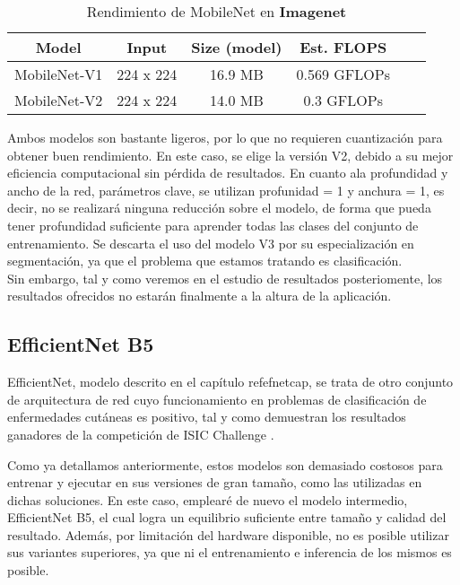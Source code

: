 \begin{table}[!ht]
	\centering
	\begin{tabular}{|c|c|c|c|c|c|}
		\hline
		\textbf{Model} & \textbf{Input} & \textbf{Size (model)} & \textbf{Est. FLOPS}  \\ \hline
		MobileNet-V1 & 224 x 224 & 16.9 MB & 0.569 GFLOPs \\ \hline
		MobileNet-V2 & 224 x 224 & 14.0 MB & 0.3 GFLOPs	  \\ \hline
	\end{tabular}
		\caption{Rendimiento de MobileNet en \textbf{Imagenet} \cite{mobilespecs}}
\end{table}

Ambos modelos son bastante ligeros, por lo que no requieren cuantización para obtener buen rendimiento. En este caso, se elige la versión V2, debido a su mejor eficiencia computacional sin pérdida de resultados. En cuanto ala profundidad y ancho de la red, parámetros clave, se utilizan profunidad = 1 y anchura = 1, es decir, no se realizará ninguna reducción sobre el modelo, de forma que pueda tener profundidad suficiente para aprender todas las clases del conjunto de entrenamiento. Se descarta el uso del modelo V3 por su especialización en segmentación, ya que el problema que estamos tratando es clasificación.\\

Sin embargo, tal y como veremos en el estudio de resultados posteriomente, los resultados ofrecidos no estarán finalmente a la altura de la aplicación.


\subsection{EfficientNet B5}

EfficientNet, modelo descrito en el capítulo ref{efnetcap},  se trata de otro conjunto de arquitectura de red cuyo funcionamiento en problemas de clasificación de enfermedades cutáneas es positivo, tal y como demuestran los resultados ganadores de la competición de ISIC Challenge \cite{1stISIC, 2ndISIC}.

Como ya detallamos anteriormente, estos modelos son demasiado costosos para entrenar y ejecutar en sus versiones de gran tamaño, como las utilizadas en dichas soluciones. En este caso, emplearé de nuevo el modelo intermedio, EfficientNet B5, el cual logra un equilibrio suficiente entre tamaño y calidad del resultado. Además, por limitación del hardware disponible, no es posible utilizar sus variantes superiores, ya que ni el entrenamiento e inferencia de los mismos es posible.

